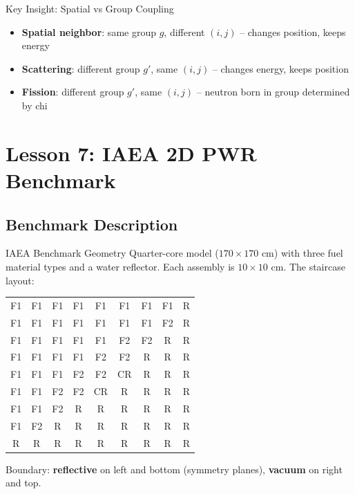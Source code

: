 \documentclass[12pt,a4paper]{article}
\begin{document}
\begin{keybox}{Key Insight: Spatial vs Group Coupling}
\begin{itemize}
  \item \textbf{Spatial neighbor}: same group $g$, different $(i,j)$
        -- changes position, keeps energy
  \item \textbf{Scattering}: different group $g'$, same $(i,j)$
        -- changes energy, keeps position
  \item \textbf{Fission}: different group $g'$, same $(i,j)$
        -- neutron born in group determined by chi
\end{itemize}
\end{keybox}

\section{Lesson 7: IAEA 2D PWR Benchmark}

\subsection{Benchmark Description}

\begin{lessonbox}{IAEA Benchmark Geometry}
Quarter-core model ($170 \times 170$ cm) with three fuel material types and
a water reflector. Each assembly is $10 \times 10$ cm. The staircase layout:

\medskip
\begin{center}
\begin{tabular}{ccccccccc}
F1&F1&F1&F1&F1&F1&F1&F1&R\\
F1&F1&F1&F1&F1&F1&F1&F2&R\\
F1&F1&F1&F1&F1&F2&F2&R&R\\
F1&F1&F1&F1&F2&F2&R&R&R\\
F1&F1&F1&F2&F2&CR&R&R&R\\
F1&F1&F2&F2&CR&R&R&R&R\\
F1&F1&F2&R&R&R&R&R&R\\
F1&F2&R&R&R&R&R&R&R\\
R&R&R&R&R&R&R&R&R\\
\end{tabular}
\end{center}

\medskip
Boundary: \textbf{reflective} on left and bottom (symmetry planes),
\textbf{vacuum} on right and top.
\end{lessonbox}
\end{document}
